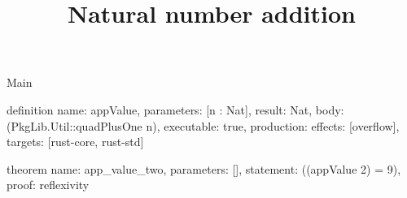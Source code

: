 \begin{lexlean}{Main}
\title{Natural number addition}
\begin{semanticmodule}
definition{
  name: appValue,
  parameters: [n : Nat],
  result: Nat,
  body: (PkgLib.Util::quadPlusOne n),
  executable: true,
  production: {effects: [overflow], targets: [rust-core, rust-std]}
}

theorem{
  name: app_value_two,
  parameters: [],
  statement: ((appValue 2) = 9),
  proof: reflexivity{}
}
\end{semanticmodule}
\end{lexlean}
